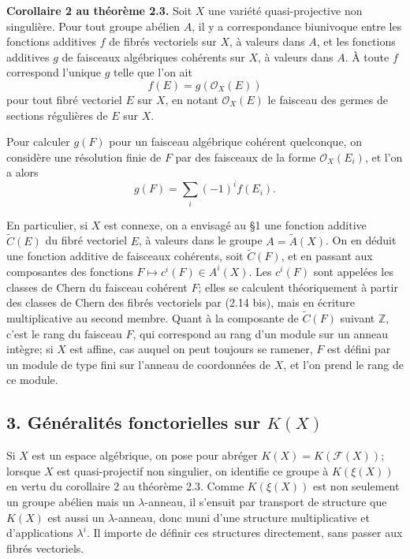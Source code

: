 \documentclass[11pt]{article}
\providecommand{\Z}{\mathbb Z}
\providecommand{\Atil}{\widetilde A}
\providecommand{\Ctil}{\widetilde C}
\providecommand{\cF}{\mathscr F}
\providecommand{\cO}{\mathcal O}
\begin{document}
\textbf{Corollaire 2 au théorème 2.3.} Soit $X$ une variété quasi-projective non singulière. Pour tout groupe abélien $A$, il y a correspondance biunivoque entre les fonctions additives $f$ de fibrés vectoriels sur $X$, à valeurs dans $A$, et les fonctions additives $g$ de faisceaux algébriques cohérents sur $X$, à valeurs dans $A$. À toute $f$ correspond l'unique $g$ telle que l'on ait
\begin{equation}\tag{2.14}
 f(E)=g(\cO_X(E))
\end{equation}
pour tout fibré vectoriel $E$ sur $X$, en notant $\cO_X(E)$ le faisceau des germes de sections régulières de $E$ sur $X$.

Pour calculer $g(F)$ pour un faisceau algébrique cohérent quelconque, on considère une résolution finie de $F$ par des faisceaux de la forme $\cO_X(E_i)$, et l'on a alors
\begin{equation}\tag{2.14 bis}
 g(F)=\sum_i(-1)^if(E_i).
\end{equation}

En particulier, si $X$ est connexe, on a envisagé au \S 1 une fonction additive $\Ctil(E)$ du fibré vectoriel $E$, à valeurs dans le groupe $A=\Atil(X)$. On en déduit une fonction additive de faisceaux cohérents, soit $\Ctil(F)$, et en passant aux composantes des fonctions $F\mapsto c^i(F)\in A^i(X)$. Les $c^i(F)$ sont appelées les classes de Chern du faisceau cohérent $F$; elles se calculent théoriquement à partir des classes de Chern des fibrés vectoriels par (2.14 bis), mais en écriture multiplicative au second membre. Quant à la composante de $\Ctil(F)$ suivant $\Z$, c'est le rang du faisceau $F$, qui correspond au rang d'un module sur un anneau intègre; si $X$ est affine, cas auquel on peut toujours se ramener, $F$ est défini par un module de type fini sur l'anneau de coordonnées de $X$, et l'on prend le rang de ce module.

\subsection*{3. Généralités fonctorielles sur $K(X)$}

Si $X$ est un espace algébrique, on pose pour abréger $K(X)=K(\cF(X))$; lorsque $X$ est quasi-projectif non singulier, on identifie ce groupe à $K(\xi(X))$ en vertu du corollaire 2 au théorème 2.3. Comme $K(\xi(X))$ est non seulement un groupe abélien mais un $\lambda$-anneau, il s'ensuit par transport de structure que $K(X)$ est aussi un $\lambda$-anneau, donc muni d'une structure multiplicative et d'applications $\lambda^i$. Il importe de définir ces structures directement, sans passer aux fibrés vectoriels.
\end{document}
